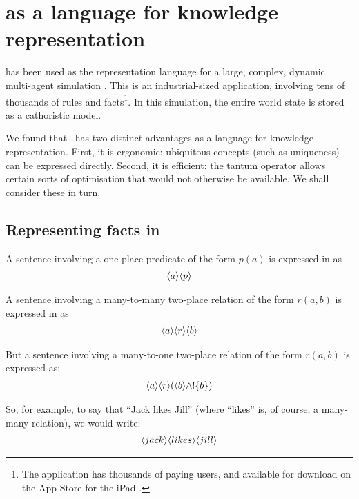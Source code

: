 \section{\Cathoristic{} as a language for knowledge representation}\label{kr}


\Cathoristic{} has been used as the representation language for a
large, complex, dynamic multi-agent simulation \cite{evans-and-short}.
This is an industrial-sized application, involving tens of thousands
of rules and facts\footnote{The application has thousands of paying
  users, and available for download on the App Store for the iPad
  \cite{Versu}.}.  In this simulation, the entire world state is stored
as a cathoristic model.
	
We found that \cathoristic\ has two distinct advantages as a language for knowledge representation. First, it is ergonomic: ubiquitous concepts (such as uniqueness) can be expressed directly.
Second, it is efficient: the tantum operator allows certain sorts of optimisation that would not otherwise be available.
We shall consider these in turn.

\subsection{Representing facts  in \cathoristic{}}

A sentence involving a one-place predicate of the form $p(a)$ is
expressed in \cathoristic{} as
\begin{eqnarray*}
   \langle a \rangle \langle p \rangle \end{eqnarray*}

\NI A sentence involving a many-to-many two-place relation of the form
$r(a,b)$ is expressed in \cathoristic{} as
\begin{eqnarray*}
  \langle a \rangle \langle r \rangle \langle b \rangle \end{eqnarray*}

\NI But a sentence involving a many-to-one two-place relation of the
form $r(a,b)$ is expressed as:
\begin{eqnarray*}
  \langle a \rangle \langle r \rangle (\langle b \rangle \land ! \{b\})
\end{eqnarray*}


\NI So, for example, to say that ``Jack likes Jill'' (where ``likes'' is,
of course, a many-many relation), we would write:
\begin{eqnarray*}
  \langle jack \rangle \langle likes \rangle \langle jill \rangle \end{eqnarray*}

